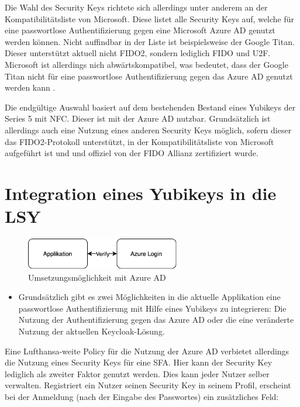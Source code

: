 Die Wahl des Security Keys richtete sich allerdings unter anderem an der Kompatibilitätsliste \cite{compWin} von Microsoft. Diese listet alle Security Keys auf, welche für eine passwortlose Authentifizierung gegen eine Microsoft Azure \ac{AD} genutzt werden können. Nicht auffindbar in der Liste ist beispielsweise der Google Titan. Dieser unterstützt aktuell nicht FIDO2, sondern lediglich FIDO und \ac{U2F}. Microsoft ist allerdings nich abwärtskompatibel, was bedeutet, dass der Google Titan nicht für eine passwortlose Authentifizierung gegen das Azure \ac{AD} genutzt werden kann \cite{seckeytest}.

Die endgültige Auswahl basiert  auf dem bestehenden Bestand eines Yubikeys der Series 5 mit NFC. Dieser ist mit der Azure \ac{AD} nutzbar. Grundsätzlich ist allerdings auch eine Nutzung eines anderen Security Keys möglich, sofern dieser das \ac{FIDO}2-Protokoll unterstützt, in der Kompatibilitätsliste von Microsoft aufgeführt ist und und offiziel von der \ac{FIDO} Allianz zertifiziert wurde.

\section{Integration eines Yubikeys in die LSY}

\begin{figure}[h]
	\centering 
	\includegraphics[width=0.6\textwidth]{img/abbildungen/azure_umsetzung.png}
	\captionsetup{format=hang}
	\caption{Umsetzungsmöglichkeit mit Azure \ac{AD}}
\end{figure}

\begin{itemize}
    \item Grundsätzlich gibt es zwei Möglichkeiten in die aktuelle Applikation eine passwortlose Authentifizierung mit Hilfe eines Yubikeys zu integrieren: Die Nutzung der Authentifizierung gegen das Azure \ac{AD} oder die eine veränderte Nutzung der aktuellen Keycloak-Lösung.

\end{itemize}

Eine Lufthansa-weite Policy für die Nutzung der Azure \ac{AD} verbietet allerdings die Nutzung eines Security Keys für eine \ac{SFA}. Hier kann der Security Key lediglich als zweiter Faktor genutzt werden. Dies kann jeder Nutzer selber verwalten. Registriert ein Nutzer seinen Security Key in seinem Profil, erscheint bei der Anmeldung (nach der Eingabe des Passwortes) ein zusätzliches Feld:

